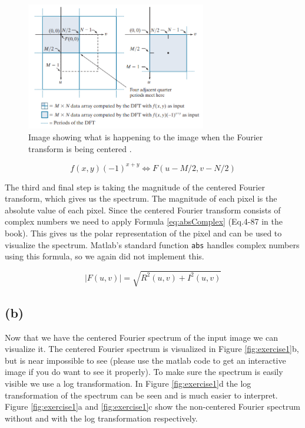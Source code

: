 \documentclass{article}
\begin{document}
\begin{figure}[h]
    \centering
    \includegraphics[width=0.7\textwidth]{Assignment_2/output_plots/centered_fourier_spectrum_book.png}
    \caption{Image showing what is happening to the image when the Fourier transform is being centered \cite{gonzalez2008digital}.}
    \label{fig:fouriershiftFromBook}
\end{figure}

\begin{equation}\label{eq:fouriershift}
    f(x, y)(-1)^{x+y} \Leftrightarrow F(u-M / 2, v-N / 2)
\end{equation}

The third and final step is taking the magnitude of the centered Fourier transform, which gives us the spectrum. The magnitude of each pixel is the absolute value of each pixel. Since the centered Fourier transform consists of complex numbers we need to apply Formula \ref{eq:absComplex} (Eq.4-87 in the book). This gives us the polar representation of the pixel and can be used to visualize the spectrum. Matlab's standard function \texttt{abs} handles complex numbers using this formula, so we again did not implement this.

\begin{equation}\label{eq:absComplex}
    |F(u, v)|=\sqrt{R^{2}(u, v)+I^{2}(u, v)}
\end{equation}

\newpage
\subsection*{(b)}
Now that we have the centered Fourier spectrum of the input image we can visualize it. The centered Fourier spectrum is visualized in Figure \ref{fig:exercise1}b, but is near impossible to see (please use the matlab code to get an interactive image if you do want to see it properly). To make sure the spectrum is easily visible we use a log transformation. In Figure \ref{fig:exercise1}d the log transformation of the spectrum can be seen and is much easier to interpret. Figure \ref{fig:exercise1}a and \ref{fig:exercise1}c show the non-centered Fourier spectrum without and with the log transformation respectively.
\end{document}
